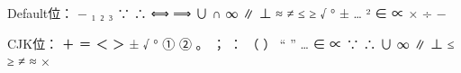 \documentclass[fontset=none]{ctexart}
\begin{document}
Default位： − ₁ ₂ ₃ ∵ ∴ ⟺ ⟹ ∪ ∩ ∞ ∥ ⊥ ≈ ≠ ≤ ≥ √ ° ± … ² ∈ ∝ ×  ÷ −

CJK位： ＋ ＝ ＜ ＞ ± √ ° ① ② 。 ； ： （ ） “ ” … ∈ ∝ ∵ ∴ ∪ ∞ ∥ ⊥ ≤ ≥ ≠ ≈ ×
\end{document}
